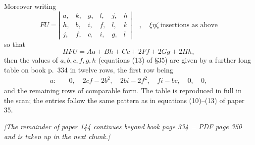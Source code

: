 \documentclass[11pt]{article}
\begin{document}
\medskip

Moreover writing
\[
FU =
\left|\begin{array}{cccccc}
a, & k, & g, & l, & j, & h \\
h, & b, & i, & f, & l, & k \\
j, & f, & c, & i, & g, & l
\end{array}\right|
\quad ,\quad \xi\eta\zeta\ \mbox{insertions as above}
\]
so that
\[
HFU = A a + B h + C c + 2 F f + 2 G g + 2 H h,
\]
then the values of $a, b, c, f, g, h$ (equations (13) of \S 35) are given by a further long table on book p.~334 in twelve rows, the first row being
\begin{align*}
a:\quad & 0,\quad 2 cf - 2 b^2,\quad 2bi - 2 f^2,\quad fi - bc,\quad 0,\quad 0,
\end{align*}
and the remaining rows of comparable form. The table is reproduced in full in the scan; the entries follow the same pattern as in equations (10)--(13) of paper 35.

\medskip

\noindent\textit{[The remainder of paper 144 continues beyond book page 334 = PDF page 350 and is taken up in the next chunk.]}
\end{document}
